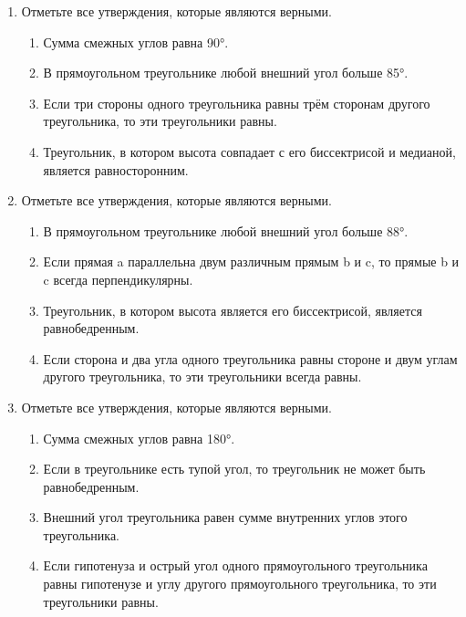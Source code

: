\documentclass[a4paper,12pt]{article}
\newcommand{\taskspace}{\par\vspace{0.42cm}}
\begin{document}
\begin{enumerate}[resume]
\taskspace

\item Отметьте все утверждения, которые являются верными.
\begin{enumerate}[label=\arabic*),leftmargin=8mm,itemsep=0.25em,topsep=0.35em]
\item Сумма смежных углов равна 90°.
\item В прямоугольном треугольнике любой внешний угол больше 85°.
\item Если три стороны одного треугольника равны трём сторонам другого треугольника, то эти треугольники равны.
\item Треугольник, в котором высота совпадает с его биссектрисой и медианой, является равносторонним.
\end{enumerate}

\taskspace

\item Отметьте все утверждения, которые являются верными.
\begin{enumerate}[label=\arabic*),leftmargin=8mm,itemsep=0.25em,topsep=0.35em]
\item В прямоугольном треугольнике любой внешний угол больше 88°.
\item Если прямая a параллельна двум различным прямым b и c, то прямые b и c всегда перпендикулярны.
\item Треугольник, в котором высота является его биссектрисой, является равнобедренным.
\item Если сторона и два угла одного треугольника равны стороне и двум углам другого треугольника, то эти треугольники всегда равны.
\end{enumerate}

\taskspace

\item Отметьте все утверждения, которые являются верными.
\begin{enumerate}[label=\arabic*),leftmargin=8mm,itemsep=0.25em,topsep=0.35em]
\item Сумма смежных углов равна 180°.
\item Если в треугольнике есть тупой угол, то треугольник не может быть равнобедренным.
\item Внешний угол треугольника равен сумме внутренних углов этого треугольника.
\item Если гипотенуза и острый угол одного прямоугольного треугольника равны гипотенузе и углу другого прямоугольного треугольника, то эти треугольники равны.
\end{enumerate}


\end{enumerate}
\end{document}
